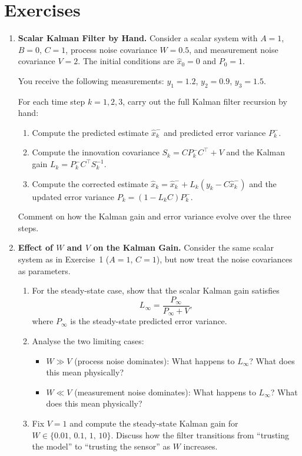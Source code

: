 \section*{Exercises}

\begin{enumerate}

\item \textbf{Scalar Kalman Filter by Hand.}
Consider a scalar system with $A = 1$, $B = 0$, $C = 1$, process noise covariance $W = 0.5$, and measurement noise covariance $V = 2$. The initial conditions are $\hat{x}_0 = 0$ and $P_0 = 1$.

You receive the following measurements: $y_1 = 1.2$, $y_2 = 0.9$, $y_3 = 1.5$.

For each time step $k = 1, 2, 3$, carry out the full Kalman filter recursion by hand:
\begin{enumerate}
	\item Compute the predicted estimate $\hat{x}_k^-$ and predicted error variance $P_k^-$.
	\item Compute the innovation covariance $S_k = C P_{k}^{-} C^\top + V$ and the Kalman gain $L_k = P_{k}^{-} C^\top S_k^{-1}$.
	\item Compute the corrected estimate $\hat{x}_k = \hat{x}_k^- + L_k(y_k - C\hat{x}_k^-)$ and the updated error variance $P_k = (1 - L_k C) P_k^-$.
\end{enumerate}
Comment on how the Kalman gain and error variance evolve over the three steps.

\item \textbf{Effect of $W$ and $V$ on the Kalman Gain.}
Consider the same scalar system as in Exercise~1 ($A = 1$, $C = 1$), but now treat the noise covariances as parameters.

\begin{enumerate}
	\item For the steady-state case, show that the scalar Kalman gain satisfies
	\[
		L_\infty = \frac{P_\infty}{P_\infty + V},
	\]
	where $P_\infty$ is the steady-state predicted error variance.
	\item Analyse the two limiting cases:
	\begin{itemize}
		\item $W \gg V$ (process noise dominates): What happens to $L_\infty$? What does this mean physically?
		\item $W \ll V$ (measurement noise dominates): What happens to $L_\infty$? What does this mean physically?
	\end{itemize}
	\item Fix $V = 1$ and compute the steady-state Kalman gain for $W \in \{0.01,\, 0.1,\, 1,\, 10\}$. Discuss how the filter transitions from ``trusting the model'' to ``trusting the sensor'' as $W$ increases.
\end{enumerate}


\end{enumerate}

